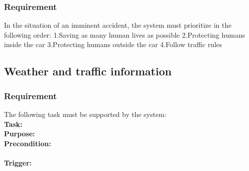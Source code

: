 \documentclass{article}
\begin{document}
      \subsubsection{Requirement}
\hfill \break 
In the situation of an imminent accident, the system must prioritize in the following order:
\hfill \break 
\indent
1.Saving as many human lives as possible
\hfill \break 
\indent
2.Protecting humans inside the car
\hfill \break 
\indent
3.Protecting humans outside the car
\hfill \break 
\indent
4.Follow traffic rules
  \subsection{Weather and traffic information}
\subsubsection {Requirement}
\hfill \break 
\- \- \-The following task must be supported by the system:\\
\hfill \break 
\textbf{Task:} \\ 
\textbf{Purpose:} \\
\textbf{Precondition:} \\
 \tab{ } \\
\textbf{Trigger:} \\
\\
\end{document}
